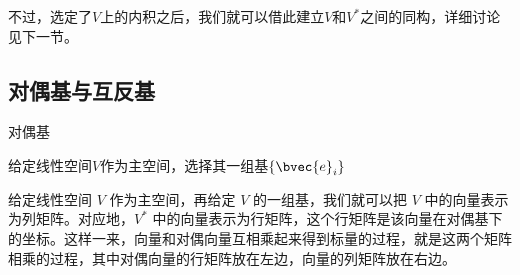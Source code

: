 不过，选定了$V$上的内积之后，我们就可以借此建立$V$和$V^*$之间的同构，详细讨论见下一节。

















\subsection{对偶基与互反基}

\begin{definition}{对偶基}

给定线性空间$V$作为主空间，选择其一组基$\{\bvec{e}_i\}$

\end{definition}


给定线性空间 $V$ 作为主空间，再给定 $V$ 的一组基，我们就可以把 $V$ 中的向量表示为列矩阵。对应地，$V^*$ 中的向量表示为行矩阵，这个行矩阵是该向量在对偶基下的坐标。这样一来，向量和对偶向量互相乘起来得到标量的过程，就是这两个矩阵相乘的过程，其中对偶向量的行矩阵放在左边，向量的列矩阵放在右边。


